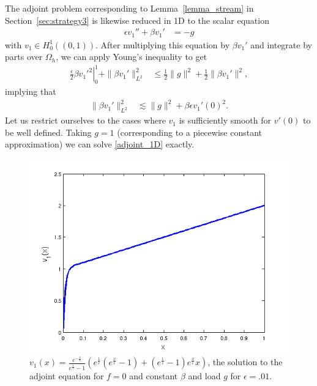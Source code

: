 \documentclass[11pt,onecolumn]{scrartcl}
\newcommand{\Oh}{\Omega_h}
\begin{document}
The adjoint problem corresponding to Lemma~\ref{lemma_stream} in Section~\ref{sec:strategy3} is likewise reduced in 1D to the scalar equation
\begin{align}
\epsilon v_1'' + \beta v_1' &= -g \label{adjoint_1D}
\end{align}
with $v_1\in H^1_0\left((0,1)\right)$.  After multiplying this equation by $\beta v_1'$ and integrate by parts over $\Oh$, we can apply Young's inequality to get
\begin{align*}
\left.\frac{\epsilon}{2} \beta v_1'^2\right|_0^1 + \|\beta v_1'\|_{L^2}^2 &\leq \frac{1}{2}\|g\|^2 + \frac{1}{2}\|\beta v_1'\|^2,
\end{align*}
implying that
\begin{align*}
\|\beta v_1'\|_{L^2}^2 & \lesssim \|g\|^2 + {\beta \epsilon} v_1'(0)^2.
\end{align*}
Let us restrict ourselves to the cases where $v_1$ is sufficiently smooth for $v'(0)$ to be well defined.  Taking $g=1$ (corresponding to a piecewise constant approximation) we can solve \eqref{adjoint_1D} exactly. 
\begin{figure}[!h]
\centering
\includegraphics[scale=.5]{figs/testBoundary1D.png}
\caption{$v_1(x) = \frac{e^{-\frac{x}{\epsilon}}}{e^{\frac{1}{\epsilon}}-1}\left(e^{\frac{1}{\epsilon}}\left(e^{\frac{x}{\epsilon}}-1\right) + \left(e^{\frac{1}{\epsilon}}-1\right)e^{\frac{x}{\epsilon}}x\right)$, the solution to the adjoint equation for $f=0$ and constant $\beta$ and load $g$ for $\epsilon = .01$.}
\label{fig:testBoundary1D}
\end{figure}
\end{document}
